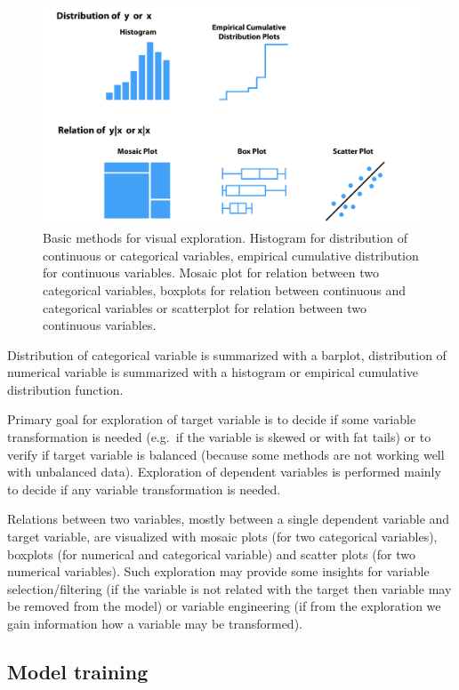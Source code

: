 \documentclass[12pt,]{krantz}
\begin{document}
\begin{figure}

{\centering \includegraphics[width=0.75\linewidth]{figure/UMEPEDA} 

}

\caption{Basic methods for visual exploration. Histogram for distribution of continuous or categorical variables, empirical cumulative distribution for continuous variables. Mosaic plot for relation between two categorical variables, boxplots for relation between continuous and categorical variables or scatterplot for relation between two continuous variables.}\label{fig:UMEPEDA}
\end{figure}

Distribution of categorical variable is summarized with a barplot, distribution of numerical variable is summarized with a histogram or empirical cumulative distribution function.

Primary goal for exploration of target variable is to decide if some variable transformation is needed (e.g.~if the variable is skewed or with fat tails) or to verify if target variable is balanced (because some methods are not working well with unbalanced data). Exploration of dependent variables is performed mainly to decide if any variable transformation is needed.

Relations between two variables, mostly between a single dependent variable and target variable, are visualized with mosaic plots (for two categorical variables), boxplots (for numerical and categorical variable) and scatter plots (for two numerical variables). Such exploration may provide some insights for variable selection/filtering (if the variable is not related with the target then variable may be removed from the model) or variable engineering (if from the exploration we gain information how a variable may be transformed).

\hypertarget{notationTraining}{%
\subsection{Model training}\label{notationTraining}}
\end{document}
